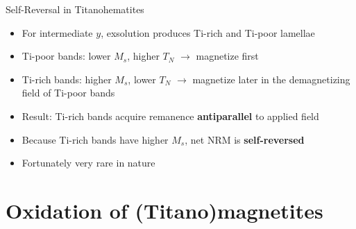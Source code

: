 \documentclass[aspectratio=169,11pt]{beamer}
\begin{document}
\begin{frame}{Self-Reversal in Titanohematites}

\begin{itemize}
  \item For intermediate $y$, exsolution produces Ti-rich and Ti-poor lamellae
  \item Ti-poor bands: lower $M_s$, higher $T_N$ $\rightarrow$ magnetize first
  \item Ti-rich bands: higher $M_s$, lower $T_N$ $\rightarrow$ magnetize later in the demagnetizing field of Ti-poor bands
  \item Result: Ti-rich bands acquire remanence \textbf{antiparallel} to applied field
  \item Because Ti-rich bands have higher $M_s$, net NRM is \textbf{self-reversed}
  \item Fortunately very rare in nature
\end{itemize}

\end{frame}

\section{Oxidation of (Titano)magnetites}
\end{document}
